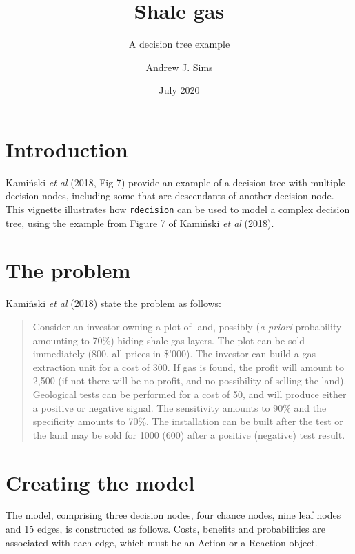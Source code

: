 \documentclass[
]{article}
\title{Shale gas}
\subtitle{A decision tree example}
\author{Andrew J. Sims}
\date{July 2020}
\begin{document}
\maketitle

\hypertarget{introduction}{%
\section{Introduction}\label{introduction}}

Kamiński \emph{et al} (2018, Fig 7) provide an example of a decision
tree with multiple decision nodes, including some that are descendants
of another decision node. This vignette illustrates how
\texttt{rdecision} can be used to model a complex decision tree, using
the example from Figure 7 of Kamiński \emph{et al} (2018).

\hypertarget{the-problem}{%
\section{The problem}\label{the-problem}}

Kamiński \emph{et al} (2018) state the problem as follows:

\begin{quote}
Consider an investor owning a plot of land, possibly (\emph{a priori}
probability amounting to 70\%) hiding shale gas layers. The plot can be
sold immediately (800, all prices in \$'000). The investor can build a
gas extraction unit for a cost of 300. If gas is found, the profit will
amount to 2,500 (if not there will be no profit, and no possibility of
selling the land). Geological tests can be performed for a cost of 50,
and will produce either a positive or negative signal. The sensitivity
amounts to 90\% and the specificity amounts to 70\%. The installation
can be built after the test or the land may be sold for 1000 (600) after
a positive (negative) test result.
\end{quote}

\hypertarget{creating-the-model}{%
\section{Creating the model}\label{creating-the-model}}

The model, comprising three decision nodes, four chance nodes, nine leaf
nodes and 15 edges, is constructed as follows. Costs, benefits and
probabilities are associated with each edge, which must be an Action or
a Reaction object.
\end{document}

